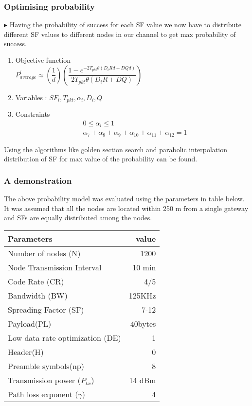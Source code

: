 \documentclass{beamer}
\begin{document}
\begin{frame}
\frametitle{Optimising probability}
$\blacktriangleright$ Having the probability of success for each SF value we now have to distribute different SF values to different nodes in our channel to get max probability of success.
\begin{enumerate}
\item Objective function \\
$P_{average}^i \approx \left(\dfrac{1}{d}\right) \left(\dfrac{1-e^{-2T_{pkt} \theta (D_iRd+DQd)}}{2T_{pkt} \theta (D_i R+DQ)}\right)$\\
\item Variables : $SF_i, T_{pkt}, \alpha_i, D_i, Q$\\
\item Constraints
\begin{align}
& 0\leq \alpha_i\leq1\\
& \alpha_7+\alpha_8+\alpha_9+\alpha_{10}+\alpha_{11}+\alpha_{12}=1
\end{align}
\end{enumerate}
Using the algorithms like golden section search and parabolic interpolation distribution of SF for max value of the probability can be found.

\end{frame}


\begin{frame}
\frametitle{A demonstration}
The above probability model was evaluated using the parameters in table below. It was assumed that all the nodes are
located within 250 m from a single gateway and SFs are equally distributed among the nodes.
\begin{table}[h!]
  \begin{center}
    \begin{tabular}{|l|r|}
    \hline 
    Parameters & value\\
    \hline
    \hline
    Number of nodes (N) & 1200\\
    \hline
    Node Transmission Interval & 10 min\\
    \hline
	Code Rate (CR) & 4/5\\
	\hline
	Bandwidth (BW) & 125KHz\\
	\hline
	Spreading Factor (SF) & 7-12\\
	\hline
	Payload(PL) & 40bytes\\
	\hline
	Low data rate optimization (DE) & 1\\
	\hline
	Header(H) & 0\\
	\hline
	Preamble symbols(np) & 8\\
	\hline
	Transmission power ($P_{tx}$) & 14 dBm\\
	\hline
	Path loss exponent ($\gamma$) & 4\\
	\hline

      
    \end{tabular}
  \end{center}
\end{table}

\end{frame}
\end{document}
